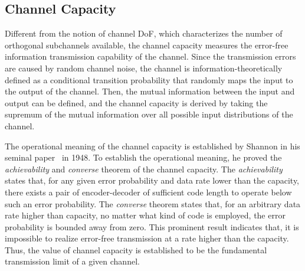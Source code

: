 \documentclass[journal,twocolumn]{IEEEtran}
\begin{document}


\vspace{-1em}
\subsection{Channel Capacity}
\label{Sec_2_Subsec_2}
Different from the notion of channel DoF, which characterizes the number of orthogonal subchannels available, the channel capacity measures the error-free information transmission capability of the channel. 
Since the transmission errors are caused by random channel noise, the channel is information-theoretically defined as a conditional transition probability that randomly maps the input to the output of the channel. 
Then, the mutual information between the input and output can be defined, and the channel capacity is derived by taking the supremum of the mutual information over all possible input distributions of the channel. 

The operational meaning of the channel capacity is established by Shannon in his seminal paper~\cite{shannon1948mathematical} in 1948. To establish the operational meaning, he proved the {\it achievability} and {\it converse} theorem of the channel capacity. The {\it achievability} states that, for any given error probability and data rate lower than the capacity, there exists a pair of encoder-decoder of sufficient code length to operate below such an error probability. 
The {\it converse} theorem states that, for an arbitrary data rate higher than capacity, no matter what kind of code is employed, the error probability is bounded away from zero. This prominent result indicates that, it is impossible to realize error-free transmission at a rate higher than the capacity. Thus, the value of channel capacity is established to be the fundamental transmission limit of a given channel. 
\end{document}
